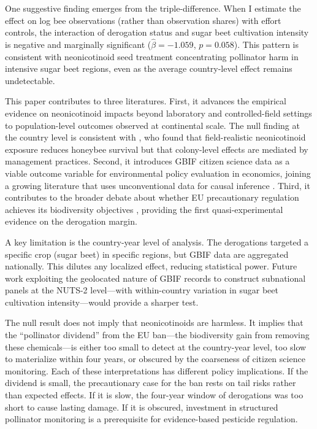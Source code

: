 \documentclass[12pt]{article}
\begin{document}
One suggestive finding emerges from the triple-difference. When I estimate the effect on log bee observations (rather than observation shares) with effort controls, the interaction of derogation status and sugar beet cultivation intensity is negative and marginally significant ($\hat{\beta} = -1.059$, $p = 0.058$). This pattern is consistent with neonicotinoid seed treatment concentrating pollinator harm in intensive sugar beet regions, even as the average country-level effect remains undetectable.

This paper contributes to three literatures. First, it advances the empirical evidence on neonicotinoid impacts beyond laboratory and controlled-field settings \citep{woodcock2017, rundlof2015} to population-level outcomes observed at continental scale. The null finding at the country level is consistent with \citet{tsvetkov2017}, who found that field-realistic neonicotinoid exposure reduces honeybee survival but that colony-level effects are mediated by management practices. Second, it introduces GBIF citizen science data as a viable outcome variable for environmental policy evaluation in economics, joining a growing literature that uses unconventional data for causal inference \citep{donaldson2016, henderson2012}. Third, it contributes to the broader debate about whether EU precautionary regulation achieves its biodiversity objectives \citep{bateman2023, dechezlepretre2019}, providing the first quasi-experimental evidence on the derogation margin.

A key limitation is the country-year level of analysis. The derogations targeted a specific crop (sugar beet) in specific regions, but GBIF data are aggregated nationally. This dilutes any localized effect, reducing statistical power. Future work exploiting the geolocated nature of GBIF records to construct subnational panels at the NUTS-2 level---with within-country variation in sugar beet cultivation intensity---would provide a sharper test.

The null result does not imply that neonicotinoids are harmless. It implies that the ``pollinator dividend'' from the EU ban---the biodiversity gain from removing these chemicals---is either too small to detect at the country-year level, too slow to materialize within four years, or obscured by the coarseness of citizen science monitoring. Each of these interpretations has different policy implications. If the dividend is small, the precautionary case for the ban rests on tail risks rather than expected effects. If it is slow, the four-year window of derogations was too short to cause lasting damage. If it is obscured, investment in structured pollinator monitoring is a prerequisite for evidence-based pesticide regulation.
\end{document}
